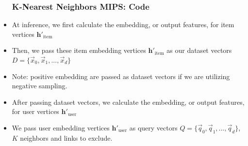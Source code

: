 \documentclass{beamer}
\begin{document}
\begin{frame}[fragile]
\begin{itemize}
\frametitle{K-Nearest Neighbors MIPS: Code}

\item At inference, we first calculate the embedding, or output features, for item vertices $\mathbf{h'}_{\text{item}}$



\item Then, we pass these item embedding vertices $\mathbf{h'}_{\text{item}}$ as our dataset vectors $D = \{\overrightarrow{x}_{0}, \overrightarrow{x}_{1}, ..., \overrightarrow{x}_{d} \}$

\item Note: positive embedding are passed as dataset vectors if we are utilizing negative sampling.

\end{itemize}
\end{frame}


\begin{frame}[fragile]
\begin{itemize}
\frametitle{K-Nearest Neighbors MIPS: Code}

\vspace{-0.3cm}

\item After passing dataset vectors, we calculate the embedding, or output features, for user vertices $\mathbf{h'}_{\text{user}}$



\vspace{-0.3cm}

\item We pass user embedding vertices $\mathbf{h'}_{\text{user}}$ as query vectors $Q = \{\overrightarrow{q}_{0}, \overrightarrow{q}_{1}, ..., \overrightarrow{q}_{d} \}$, $K$ neighbors and links to exclude.

\end{itemize}
\end{frame}

\end{document}
